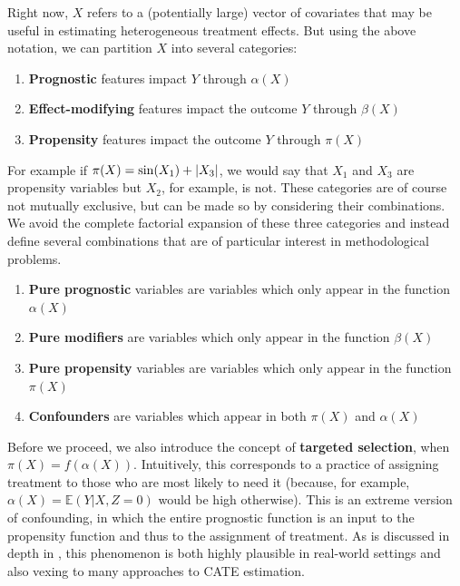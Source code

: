 \documentclass[11pt,  dvipsnames, table, x11name]{article}
\newcommand\E[1]{\mathbb{E}\left(#1\right)}
\begin{document}
	Right now, $X$ refers to a (potentially large) vector of covariates that may be useful in 
	estimating heterogeneous treatment effects. But using the above notation, we can partition 
	$X$ into several categories:
	\begin{enumerate}
		\item \textbf{Prognostic} features impact $Y$ through $\alpha(X)$
		\item \textbf{Effect-modifying} features impact the outcome $Y$ through $\beta(X)$
		\item \textbf{Propensity} features impact the outcome $Y$ through $\pi(X)$
	\end{enumerate}
	For example if $\pi(X) = \sin(X_1) + \abs{X_3}$, we would say that $X_1$ and $X_3$ are 
	propensity variables but $X_2$, for example, is not. These categories are of course not 
	mutually exclusive, but can be made so by considering their combinations. We avoid the 
	complete factorial expansion of these three categories and instead define several combinations 
	that are of particular interest in methodological problems.
	\begin{enumerate}
		\item \textbf{Pure prognostic} variables are variables which only appear in the function $\alpha(X)$
		\item \textbf{Pure modifiers} are variables which only appear in the function $\beta(X)$
		\item \textbf{Pure propensity} variables are variables which only appear in the function $\pi(X)$
		\item \textbf{Confounders} are variables which appear in both $\pi(X)$ and $\alpha(X)$
	\end{enumerate}
	
	Before we proceed, we also introduce the concept of \textbf{targeted selection}, when 
	$\pi(X) = f(\alpha(X))$. Intuitively, this corresponds to a practice of assigning treatment to those who 
	are most likely to need it (because, for example, $\alpha(X) = \E{Y | X, Z = 0}$ would be high otherwise). 
	This is an extreme version of confounding, in which the entire prognostic function is an input to the 
	propensity function and thus to the assignment of treatment. As is discussed in depth in \cite{hahn2020bayesian}, 
	this phenomenon is both highly plausible in real-world settings and also vexing to many approaches to CATE estimation.
	
\end{document}

